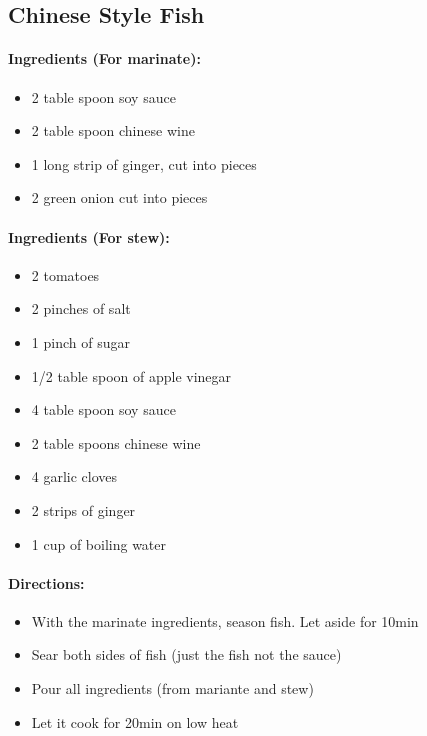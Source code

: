 \documentclass{article}
\begin{document}
\subsection{Chinese Style Fish}

\paragraph{Ingredients (For marinate):}

\begin{itemize}
	\item 2 table spoon soy sauce
	\item 2 table spoon chinese wine
	\item 1 long strip of ginger, cut into pieces
	\item 2 green onion cut into pieces
\end{itemize}

\paragraph{Ingredients (For stew):}

\begin{itemize}
	\item 2 tomatoes
	\item 2 pinches of salt
	\item 1 pinch of sugar
	\item 1/2 table spoon of apple vinegar
	\item 4 table spoon soy sauce
	\item 2 table spoons chinese wine
	\item 4 garlic cloves
	\item 2 strips of ginger
	\item 1 cup of boiling water
\end{itemize}

\paragraph{Directions:}
\begin{itemize}
	\item With the marinate ingredients, season fish. Let aside for 10min
	\item Sear both sides of fish (just the fish not the sauce)
	\item Pour all ingredients (from mariante and stew)
	\item Let it cook for 20min on low heat
\end{itemize}
\end{document}
